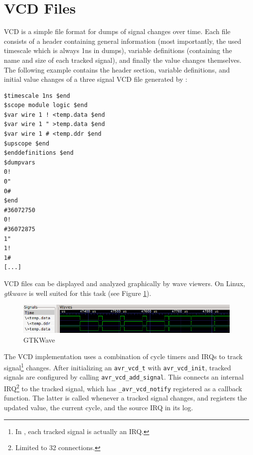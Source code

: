 \section{\acf{VCD} Files} \label{section:vcd_files}

\ac{VCD} is a simple file format for dumps of signal changes over time. Each file
consists of a header containing general information (most importantly, the
used timescale which is always 1ns in \simavr dumps), variable definitions
(containing the name and size of each tracked signal), and finally the value
changes themselves. The following example contains the header section, variable
definitions, and initial value changes of a three signal \ac{VCD} file generated
by \simavr:

\begin{verbatim}
$timescale 1ns $end
$scope module logic $end
$var wire 1 ! <temp.data $end
$var wire 1 " >temp.data $end
$var wire 1 # <temp.ddr $end
$upscope $end
$enddefinitions $end
$dumpvars
0!
0"
0#
$end
#36072750
0!
#36072875
1"
1!
1#
[...]
\end{verbatim}


\ac{VCD} files can be displayed and analyzed graphically by wave viewers. On Linux,
\emph{gtkwave} is well suited for this task (see Figure \ref{fig:gtkwave}).

\begin{figure}[ht]
\includegraphics[width=\textwidth]{images/gtkwave}
\caption{GTKWave}
\label{fig:gtkwave}
\end{figure}

The \simavr \ac{VCD} implementation uses a combination of cycle timers
and \acp{IRQ} to track signal\footnote{
%
In \simavr, each tracked signal is actually an \ac{IRQ}.
%
} changes. After initializing an \lstinline|avr_vcd_t|
with \lstinline|avr_vcd_init|, tracked signals are configured by calling
\lstinline|avr_vcd_add_signal|. This connects an internal \ac{IRQ}\footnote{
Limited to 32 connections.} to the tracked signal, which has
\lstinline|_avr_vcd_notify| registered as a callback function. The latter is
called whenever a tracked signal changes, and registers the updated value, the
current cycle, and the source \ac{IRQ} in its log.

